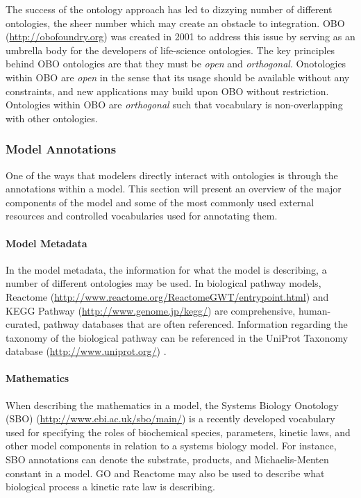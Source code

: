 The success of the ontology approach has led to dizzying number of
different ontologies, the sheer number which may create an obstacle to
integration. OBO (\url{http://obofoundry.org}) \autocite{smith2007obo}
was created in 2001 to address this issue by serving as an umbrella body
for the developers of life-science ontologies. The key principles behind
OBO ontologies are that they must be \emph{open} and \emph{orthogonal}.
Onotologies within OBO are \emph{open} in the sense that its usage
should be available without any constraints, and new applications may
build upon OBO without restriction. Ontologies within OBO are
\emph{orthogonal} such that vocabulary is non-overlapping with other
ontologies.

\subsubsection{Model Annotations}

One of the ways that modelers directly interact with ontologies is
through the annotations within a model. This section will present an
overview of the major components of the model and some of the most
commonly used external resources and controlled vocabularies used for
annotating them.

\paragraph{Model Metadata}

In the model metadata, the information for what the model is describing,
a number of different ontologies may be used. In biological pathway
models, Reactome
(\url{http://www.reactome.org/ReactomeGWT/entrypoint.html})
\autocite{joshi2005reactome} and KEGG Pathway
(\url{http://www.genome.jp/kegg/}) \autocite{ogata1999kegg} are
comprehensive, human-curated, pathway databases that are often
referenced. Information regarding the taxonomy of the biological pathway
can be referenced in the UniProt Taxonomy database
(\url{http://www.uniprot.org/}) \autocite{bairoch2005universal}.

\paragraph{Mathematics}

When describing the mathematics in a model, the Systems Biology
Onotology (SBO) (\url{http://www.ebi.ac.uk/sbo/main/})
\autocite{le2006model} is a recently developed vocabulary used for
specifying the roles of biochemical species, parameters, kinetic laws,
and other model components in relation to a systems biology model. For
instance, SBO annotations can denote the substrate, products, and
Michaelis-Menten constant in a model. GO and Reactome may also be used
to describe what biological process a kinetic rate law is describing.

